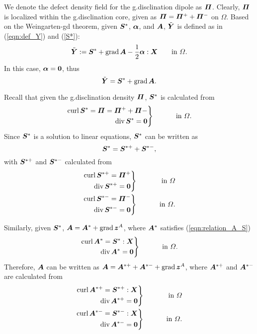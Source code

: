 \documentclass[11pt,letterpaper]{article}
\newenvironment{rcases}
  {\left.\begin{aligned}}
  {\end{aligned}\right\rbrace}
\begin{document}
We denote the defect density field for the g.disclination dipole as $\bfPi$. Clearly, $\bfPi$ is localized within the g.disclination core, given as $\bfPi = \bfPi^{+}+\bfPi^{-}$ on $\Omega$. Based on the Weingarten-gd theorem, given $\bfS^*$, $\bfalpha$, and $\bfA$, $\tilde{\bfY}$ is defined as in (\ref{eqn:def_Y}) and (\ref{S*}):
\[
\tilde{\bfY} := \bfS^{*} + \grad \bfA - \frac{1}{2}\bfalpha :\bfX \qquad \text{in $\Omega$}.
\]
In this case, $\bfalpha = \bf0$, thus
\begin{equation} \label{eqn:Y_dipole}
\tilde{\bfY} = \bfS^{*} + \grad \bfA.
\end{equation}

Recall that given the g.disclination density $\bfPi$, $\bfS^{*}$ is calculated from 
\begin{eqnarray*}
\begin{rcases}
\curl \bfS^{*} = \bfPi = \bfPi^{+}+\bfPi{-} \\
\divergence \bfS^{*} = \bf0
\end{rcases}
&&\qquad \text{ in $\Omega$}.
\end{eqnarray*}
Since $\bfS^{*}$ is a solution to linear equations, $\bfS^{*}$ can be written as  
\[
\bfS^{*} = \bfS^{*+} +\bfS^{*-},
\]
with $\bfS^{*+}$ and $\bfS^{*-}$ calculated from
\begin{eqnarray*}
\begin{rcases}
\curl \bfS^{*+} = \bfPi^+ \\
\divergence \bfS^{*+} = \bf0 
\end{rcases}
&&\qquad \text{ in $\Omega$} \\
\begin{rcases}
\curl \bfS^{*-} = \bfPi^- \\
\divergence \bfS^{*-} = \bf0 
\end{rcases}
&&\qquad \text{ in $\Omega$}.
\end{eqnarray*}

Similarly, given $\bfS^{*}$, $\bfA = \bfA^{*}+\grad \bfz^A$, where $\bfA^{*}$ satisfies (\ref{eqn:relation_A_S})
\begin{eqnarray*}
\begin{rcases}
\curl \bfA^{*} = \bfS^{*}:\bfX \\
\divergence \bfA^{*} = \bf0 
\end{rcases}
&&\qquad \text{ in $\Omega$}.
\end{eqnarray*}
Therefore, $\bfA$ can be written as $\bfA = \bfA^{*+} + \bfA^{*-} + \grad \bfz^A$, where $\bfA^{*+}$ and $\bfA^{*-}$ are calculated from 
\begin{eqnarray*}
\begin{rcases}
\curl \bfA^{*+} = \bfS^{*+}:\bfX \\
\divergence \bfA^{*+} = \bf0 
\end{rcases}
&&\qquad \text{ in $\Omega$} \\
\begin{rcases}
\curl \bfA^{*-} = \bfS^{*-}:\bfX \\
\divergence \bfA^{*-} = \bf0 
\end{rcases}
&&\qquad \text{ in $\Omega$}.
\end{eqnarray*}
\end{document}
